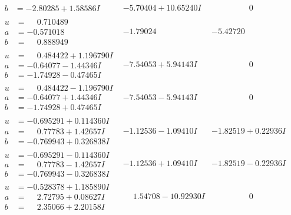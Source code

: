 \documentclass[1p]{elsarticle_modified}
\theoremstyle{definition}
\begin{document}
$$\begin{array}{c|c|c}
\begin{aligned}
b &= -2.80285 + 1.58586 I\end{aligned}
 & -5.70404 + 10.65240 I & \phantom{-0.000000 } 0 \\ \hline\begin{aligned}
u &= \phantom{-}0.710489\phantom{ +0.000000I} \\
a &= -0.571018\phantom{ +0.000000I} \\
b &= \phantom{-}0.888949\phantom{ +0.000000I}\end{aligned}
 & -1.79024\phantom{ +0.000000I} & -5.42720\phantom{ +0.000000I} \\ \hline\begin{aligned}
u &= \phantom{-}0.484422 + 1.196790 I \\
a &= -0.64077 - 1.44346 I \\
b &= -1.74928 - 0.47465 I\end{aligned}
 & -7.54053 + 5.94143 I & \phantom{-0.000000 } 0 \\ \hline\begin{aligned}
u &= \phantom{-}0.484422 - 1.196790 I \\
a &= -0.64077 + 1.44346 I \\
b &= -1.74928 + 0.47465 I\end{aligned}
 & -7.54053 - 5.94143 I & \phantom{-0.000000 } 0 \\ \hline\begin{aligned}
u &= -0.695291 + 0.114360 I \\
a &= \phantom{-}0.77783 + 1.42657 I \\
b &= -0.769943 + 0.326838 I\end{aligned}
 & -1.12536 - 1.09410 I & -1.82519 + 0.22936 I \\ \hline\begin{aligned}
u &= -0.695291 - 0.114360 I \\
a &= \phantom{-}0.77783 - 1.42657 I \\
b &= -0.769943 - 0.326838 I\end{aligned}
 & -1.12536 + 1.09410 I & -1.82519 - 0.22936 I \\ \hline\begin{aligned}
u &= -0.528378 + 1.185890 I \\
a &= \phantom{-}2.72795 + 0.08627 I \\
b &= \phantom{-}2.35066 + 2.20158 I\end{aligned}
 & \phantom{-}1.54708 - 10.92930 I & \phantom{-0.000000 } 0 \\ \hline\begin{aligned}

\end{aligned}
\end{array}$$
\end{document}
